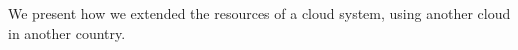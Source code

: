 We present how we extended the resources of a cloud
system, using another cloud in another country.
%
